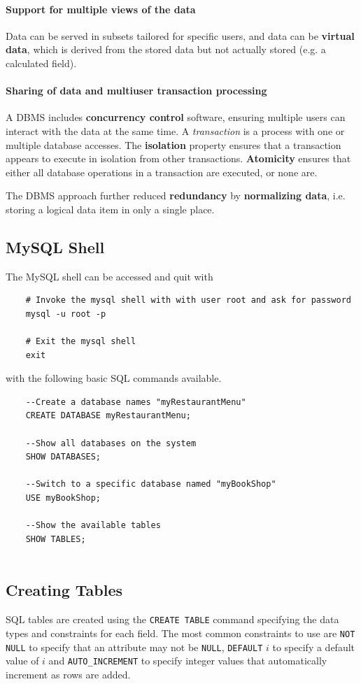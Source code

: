 \paragraph{Support for multiple views of the data} Data can be served in subsets tailored for specific users, and data can be \textbf{virtual data}, which is derived from the stored data but not actually stored (e.g. a calculated field).

\paragraph{Sharing of data and multiuser transaction processing} A DBMS includes \textbf{concurrency control} software, ensuring multiple users can interact with the data at the same time. A \emph{transaction} is a process with one or multiple database accesses. The \textbf{isolation} property ensures that a transaction appears to execute in isolation from other transactions. \textbf{Atomicity} ensures that either all database operations in a transaction are executed, or none are.

The DBMS approach further reduced \textbf{redundancy} by \textbf{normalizing data}, i.e. storing a logical data item in only a single place.


\subsection{MySQL Shell}
The MySQL shell can be accessed and quit with 
\begin{verbatim}
	# Invoke the mysql shell with with user root and ask for password 
	mysql -u root -p
	
	# Exit the mysql shell
	exit
\end{verbatim}
with the following basic SQL commands available.

\begin{verbatim}
	--Create a database names "myRestaurantMenu"
	CREATE DATABASE myRestaurantMenu;

	--Show all databases on the system
	SHOW DATABASES;
	
	--Switch to a specific database named "myBookShop"
	USE myBookShop;

	--Show the available tables
	SHOW TABLES;


\end{verbatim}

\subsection{Creating Tables}
SQL tables are created using the \texttt{CREATE TABLE} command specifying the data types and constraints for each field. The most common constraints to use are \texttt{NOT NULL} to specify that an attribute may not be \texttt{NULL},  \texttt{DEFAULT} \( i \)  to specify a default value of \( i \) and \texttt{AUTO\_INCREMENT} to specify integer values that automatically increment as rows are added.


